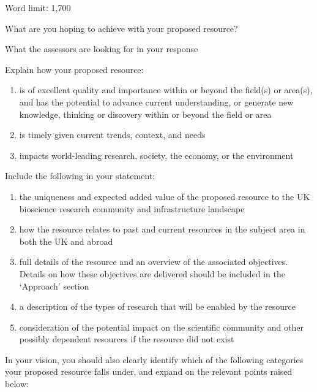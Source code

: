 \documentclass[11pt]{article}
\newenvironment{instruction}{%
    \begin{tcolorbox}[breakable,colback=red!5,colframe=red,title=Instruction]%
	}{%
    	\end{tcolorbox}%
	}
\begin{document}
\begin{instruction}

Word limit: 1,700

What are you hoping to achieve with your proposed resource?

What the assessors are looking for in your response

Explain how your proposed resource:

\begin{enumerate}

	\item is of excellent quality and importance within or beyond the field(s)
or area(s), and has the potential to advance current understanding, or generate
new knowledge, thinking or discovery within or beyond the field or area

	\item is timely given current trends, context, and needs

	\item impacts world-leading research, society, the economy, or the
environment

\end{enumerate}

Include the following in your statement:

\begin{enumerate}

	\item the uniqueness and expected added value of the proposed resource to
the UK bioscience research community and infrastructure landscape

	\item how the resource relates to past and current resources in the subject
area in both the UK and abroad

	\item full details of the resource and an overview of the associated
objectives.  Details on how these objectives are delivered should be included
in the ‘Approach’ section

	\item a description of the types of research that will be enabled by the
resource

	\item consideration of the potential impact on the scientific community and
other possibly dependent resources if the resource did not exist

\end{enumerate}

In your vision, you should also clearly identify which of the following categories
your proposed resource falls under, and expand on the relevant points raised
below:


\end{instruction}
\end{document}
